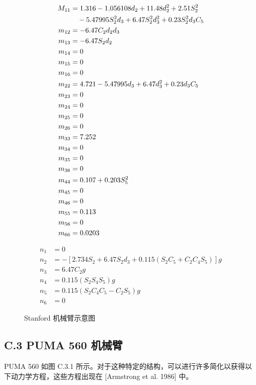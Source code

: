 \documentclass[UTF8]{ctexart}
\begin{document}
\begin{align*}
M_{11} &= 1.316 - 1.056108d_2 + 11.48d_2^2 + 2.51S_2^2 \notag\\
&\quad - 5.47995S_2^2d_3 + 6.47S_2^2d_3^2 + 0.23S_2^2d_3C_5 \\
m_{12} &= -6.47C_2d_2d_3 \\
m_{13} &= -6.47S_2d_2 \\
m_{14} &= 0 \\
m_{15} &= 0 \\
m_{16} &= 0 \\
m_{22} &= 4.721 - 5.47995d_3 + 6.47d_3^2 + 0.23d_3C_5 \\
m_{23} &= 0 \\
m_{24} &= 0 \\
m_{25} &= 0 \\
m_{26} &= 0 \\
m_{33} &= 7.252 \\
m_{34} &= 0 \\
m_{35} &= 0 \\
m_{36} &= 0 \\
m_{44} &= 0.107 + 0.203S_5^2 \\
m_{45} &= 0 \\
m_{46} &= 0 \\
m_{55} &= 0.113 \\
m_{56} &= 0 \\
m_{66} &= 0.0203
\end{align*}

\begin{align*}
n_1 &= 0 \\
n_2 &= -[2.734S_2 + 6.47S_2d_3 + 0.115(S_2C_5 + C_2C_4S_5)]g \\
n_3 &= 6.47C_2g \\
n_4 &= 0.115(S_2S_4S_5)g \\
n_5 &= 0.115(S_2C_4C_5 - C_2S_5)g \\
n_6 &= 0
\end{align*}

\begin{figure}[H]
\centering
{}
\caption{Stanford 机械臂示意图}
\end{figure}

\subsection*{C.3 PUMA 560 机械臂}

PUMA 560 如图 C.3.1 所示。对于这种特定的结构，可以进行许多简化以获得以下动力学方程，这些方程出现在 [Armstrong et al. 1986] 中。
\end{document}

